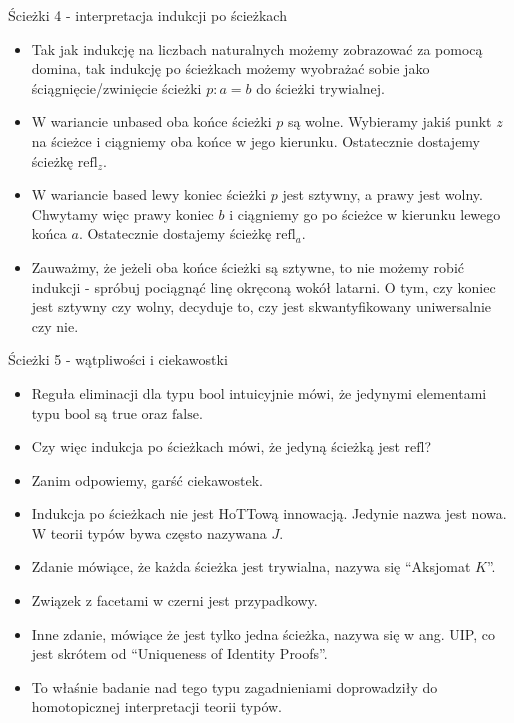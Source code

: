 \documentclass{beamer}
\newcommand{\refl}[1]{\text{refl}_{#1}}
\begin{document}
\begin{frame}{Ścieżki 4 - interpretacja indukcji po ścieżkach}
\begin{itemize}
	\item Tak jak indukcję na liczbach naturalnych możemy zobrazować za pomocą domina, tak indukcję po ścieżkach możemy wyobrażać sobie jako ściągnięcie/zwinięcie ścieżki $p : a = b$ do ścieżki trywialnej.
	\item W wariancie unbased oba końce ścieżki $p$ są wolne. Wybieramy jakiś punkt $z$ na ścieżce i ciągniemy oba końce w jego kierunku. Ostatecznie dostajemy ścieżkę $\refl{z}$.
	\item W wariancie based lewy koniec ścieżki $p$ jest sztywny, a prawy jest wolny. Chwytamy więc prawy koniec $b$ i ciągniemy go po ścieżce w kierunku lewego końca $a$. Ostatecznie dostajemy ścieżkę $\refl{a}$.
	\item Zauważmy, że jeżeli oba końce ścieżki są sztywne, to nie możemy robić indukcji - spróbuj pociągnąć linę okręconą wokół latarni. O tym, czy koniec jest sztywny czy wolny, decyduje to, czy jest skwantyfikowany uniwersalnie czy nie.
\end{itemize}
\end{frame}

\begin{frame}{Ścieżki 5 - wątpliwości i ciekawostki}
\begin{itemize}
	\item Reguła eliminacji dla typu $\text{bool}$ intuicyjnie mówi, że jedynymi elementami typu $\text{bool}$ są $\text{true}$ oraz $\text{false}$.
	\item Czy więc indukcja po ścieżkach mówi, że jedyną ścieżką jest $\text{refl}$?
	\item Zanim odpowiemy, garść ciekawostek.
	\item Indukcja po ścieżkach nie jest HoTTową innowacją. Jedynie nazwa jest nowa. W teorii typów bywa często nazywana $J$.
	\item Zdanie mówiące, że każda ścieżka jest trywialna, nazywa się ``Aksjomat $K$''.
	\item Związek z facetami w czerni jest przypadkowy.
	\item Inne zdanie, mówiące że jest tylko jedna ścieżka, nazywa się w ang. UIP, co jest skrótem od ``Uniqueness of Identity Proofs''.
	\item To właśnie badanie nad tego typu zagadnieniami doprowadziły do homotopicznej interpretacji teorii typów.
\end{itemize}
\end{frame}
\end{document}
